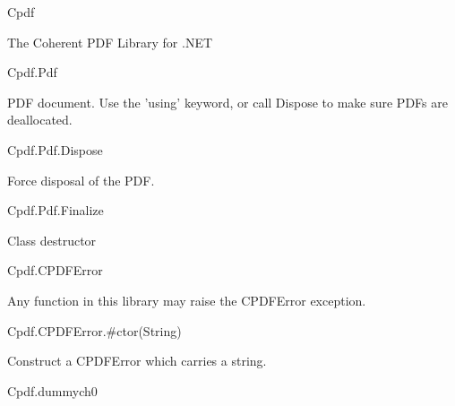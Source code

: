 Cpdf

The Coherent PDF Library for .NET

Cpdf.Pdf

PDF document. Use the 'using' keyword, or call Dispose to make sure PDFs are deallocated.

Cpdf.Pdf.Dispose

Force disposal of the PDF.

Cpdf.Pdf.Finalize

Class destructor

Cpdf.CPDFError

Any function in this library may raise the CPDFError exception.

Cpdf.CPDFError.#ctor(String)

Construct a CPDFError which carries a string.

Cpdf.dummych0

